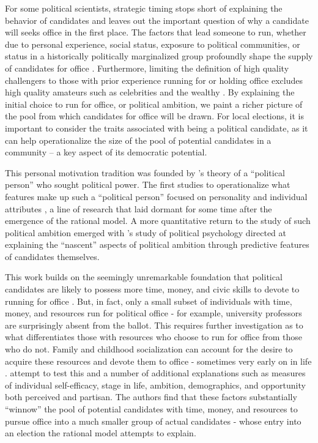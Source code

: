 For some political scientists, strategic timing stops short of explaining the
 behavior of candidates and leaves out the important question of why a candidate 
will seeks office in the first place. The factors that lead someone to run, whether 
due to personal experience, social status, exposure to political communities, or 
status in a historically politically marginalized group profoundly shape the supply 
of candidates for office \citep{AJPS:AJPS147}. Furthermore, limiting the definition 
of high quality challengers to those with prior experience running for or holding office 
excludes high quality amateurs such as celebrities and the wealthy 
\citep{CanonArt, CanonBook, fowler96}. By explaining the initial choice to run 
for office, or political ambition, we paint a richer picture of the pool from 
which candidates for office will be drawn. For local elections, it is important 
to consider the traits associated with being a political candidate, as it can 
help operationalize the size of the pool of potential candidates in a community -- 
a key aspect of its democratic potential. 

This personal motivation tradition was founded by \citet{Lasswell}'s theory of a 
``political person'' who sought political power. The first studies to operationalize 
what features make up such a ``political person'' focused on personality and individual 
attributes \citep{barber1, fishel1}, a line of research that laid dormant for some time 
after the emergence of the rational model. A more quantitative return to 
the study of such political ambition emerged with \citet{AJPS:AJPS147}'s study of 
political psychology directed at explaining the ``nascent'' aspects of political ambition
through predictive features of candidates themselves. 

This work builds on the seemingly unremarkable foundation that political 
candidates are likely to possess more time, money, and civic skills to 
devote to running for office \citep{Verba1}. But, in fact, only a small subset 
of individuals with time, money, and resources run for political office - for 
example, university professors are surprisingly absent from the ballot. This requires further 
investigation as to what differentiates those with resources who choose to run for 
office from those who do not. Family and childhood socialization can account for 
the desire to acquire these resources and devote them to office - sometimes very 
early on in life \citep{prewitt1, beckjennings}. 
\citet{AJPS:AJPS147} attempt to test this and a number of additional explanations 
such as measures of individual self-efficacy, stage in life, ambition, demographics, 
and opportunity both perceived and partisan. The authors find that these factors 
substantially ``winnow'' the pool of potential candidates with time, money, and resources to 
pursue office into a much smaller group of actual candidates - whose entry into 
an election the rational model attempts to explain. 


